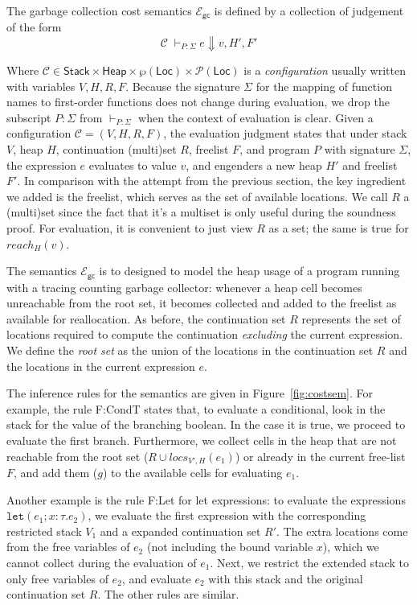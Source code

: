 \documentclass{easychair}
\newcommand{\ms}[1]{\ensuremath{\mathsf{#1}}}
\newcommand{\irl}[1]{\mathtt{#1}}
\newcounter{rule}
\newcommand{\gcSem}{\ensuremath{\mathcal{E}_{\ms{gc}}}}
\theoremstyle{definition}
\begin{document}
The garbage collection cost semantics \gcSem{} is defined by a collection of judgement of the form
\[
\mathcal{C} \; \vdash_{P : \Sigma} e \Downarrow v, H', F'
\]

Where $\mathcal{C} \in \ms{Stack} \times \ms{Heap} \times
\wp(\ms{Loc}) \times \mathcal{P}(\ms{Loc})$ is a \emph{configuration}
usually written with variables $V,H,R,F$. 
Because the signature $\Sigma$ for the mapping of function names to first-order functions 
does not change during evaluation, we drop the subscript $P:\Sigma$ from $\vdash_{P:\Sigma}$ 
when the context of evaluation is clear. Given a configuration $\mathcal{C} = (V,H,R,F)$,
the evaluation judgment states that under stack $V$, heap $H$, continuation (multi)set $R$,
freelist $F$, and program $P$ with signature $\Sigma$, the expression $e$ evaluates to value $v$, 
and engenders a new heap $H'$ and freelist $F'$. In comparison with the attempt from 
the previous section, the key ingredient we added is the freelist, which serves 
as the set of available locations. We call $R$ a (multi)set since the fact that 
it's a multiset is only useful during the soundness proof. For evaluation, it is 
convenient to just view $R$ as a set; the same is true for $reach_H(v)$.

The semantics \gcSem{} is to designed to model the heap usage of a program running with a 
tracing counting garbage collector: whenever a heap cell becomes unreachable from the 
root set, it becomes collected and added to the freelist as available for reallocation.
As before, the continuation set $R$ represents the set of locations 
required to compute the continuation \emph{excluding} the current expression.
We define the  \emph{root set} as the union of the locations in the continuation set $R$ 
and the locations in the current expression $e$. 

The inference rules for the semantics are given in Figure~\ref{fig:costsem}.
For example, the rule F:CondT states that, to evaluate a conditional, 
look in the stack for the value of the branching boolean.
In the case it is true, we proceed to evaluate the first branch.
Furthermore, we collect cells in the heap
that are not reachable from the root set ($R \cup locs_{V',H}(e_1)$) 
or already in the current free-list
$F$, and add them ($g$) to the available cells for evaluating $e_1$. 

Another example is the rule F:Let for let expressions:
to evaluate the expressions $\irl{let}(e_1; x {:} \tau.e_2)$, we evaluate the first 
expression with the corresponding restricted stack $V_1$ and a expanded continuation set $R'$. 
The extra locations come from the free variables of $e_2$ (not including the bound variable $x$),
which we cannot collect during the evaluation of $e_1$. Next, we restrict the extended stack 
to only free variables of $e_2$, and evaluate $e_2$ with this stack and the original continuation 
set $R$. The other rules are similar. 
\end{document}
